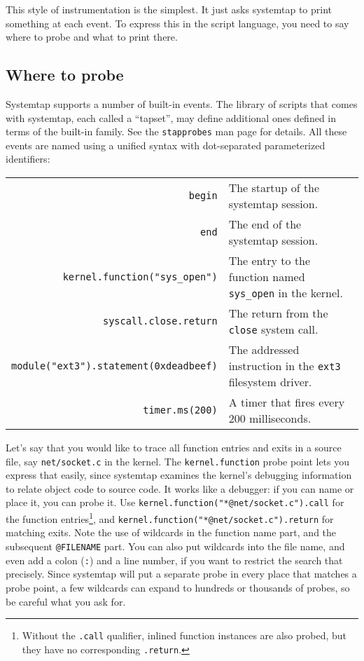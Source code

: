 \documentclass{article}
\renewcommand{\nomenclature}[2]{}
\begin{document}
This style of instrumentation is the simplest.  It just asks systemtap
to print something at each event.  To express this in the script
language, you need to say where to probe and what to print there.

\subsection{Where to probe}

Systemtap supports a number of built-in events.  The library of
scripts that comes with systemtap, each called a ``tapset'', may
define additional ones defined in terms of the built-in family.  See
the \verb+stapprobes+ man page for details.  \nomenclature{tapset}{A
reusable script forming part of the automatically searched tapset
library.}  All these events are named using a unified syntax with
dot-separated parameterized identifiers:

\begin{tabular}{rl}
\verb+begin+ & The startup of the systemtap session. \\
\verb+end+ & The end of the systemtap session. \\
\verb+kernel.function("sys_open")+ & The entry to the function named
\verb+sys_open+ in the kernel. \\
\verb+syscall.close.return+ & The return from the \verb+close+ system
call. \\
\verb+module("ext3").statement(0xdeadbeef)+ & The addressed instruction
in the \verb+ext3+ filesystem driver. \\
\verb+timer.ms(200)+ & A timer that fires every 200 milliseconds. \\
\end{tabular}

Let's say that you would like to trace all function entries and exits
in a source file, say \verb+net/socket.c+ in the kernel.  The
\verb+kernel.function+ probe point lets you express that easily, since
systemtap examines the kernel's debugging information to relate object
code to source code.  It works like a debugger: if you can name or
place it, you can probe it.  Use
\verb+kernel.function("*@net/socket.c").call+ for the function
entries\footnote{Without the {\tt .call} qualifier, inlined function
instances are also probed, but they have no corresponding {\tt .return}.},
and \verb+kernel.function("*@net/socket.c").return+ for matching exits.  Note
the use of wildcards in the function name part, and the subsequent
\verb+@FILENAME+ part.  You can also put wildcards into the file name,
and even add a colon (\verb+:+) and a line number, if you want to
restrict the search that precisely.  Since systemtap will put a
separate probe in every place that matches a probe point, a few
wildcards can expand to hundreds or thousands of probes, so be careful
what you ask for.  \nomenclature{debug information}{Data created by the
compiler when the kernel or application was built, sometimes packaged into
{\tt debuginfo} files, for use by a symbolic debugger.}
\nomenclature{wildcard}{Presence of \verb+*+ globbing patterns in probe points.}
\end{document}
